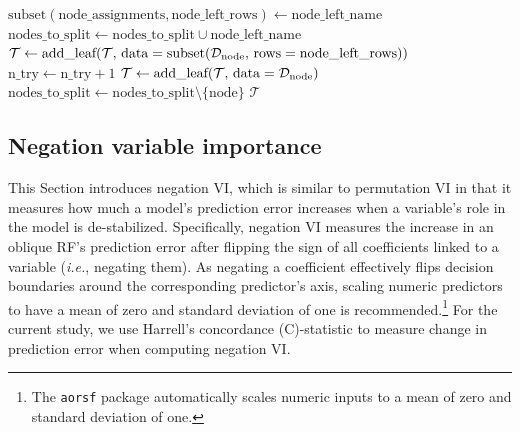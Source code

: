 \documentclass[12pt]{article}\usepackage[]{graphicx}\usepackage[]{xcolor}
\newcommand{\dataset}{{\cal D}}
\newcommand{\ie}{\textit{i.e.}}
\begin{document}
\begin{algorithm}
\begin{algorithmic}[1]
         \State $\text{subset}(\text{node\_assignments}, \text{node\_left\_rows}) \gets \text{node\_left\_name}$
           \State $\text{nodes\_to\_split} \gets \text{nodes\_to\_split} \cup \text{node\_left\_name}$
         \Else
           \State $\mathcal{T} \gets \text{add\_leaf}(\mathcal{T},\, \text{data} = \text{subset}(\dataset_{\text{node}},\,\text{rows} = \text{node\_left\_rows}))$
         \EndIf
         \State $\text{n\_try} \gets \text{n\_try} + 1$
         \State {}
       \Else
         \State $\mathcal{T} \gets \text{add\_leaf}(\mathcal{T},\, \text{data} =\dataset_{\text{node}})$
       \EndIf
       \State $\text{nodes\_to\_split} \gets \text{nodes\_to\_split} \setminus \{\text{node}\}$
     \EndFor
  \EndWhile
  \State \Return $\mathcal{T}$
  \end{algorithmic}
\end{algorithm}

\subsection{Negation variable importance} \label{sec:negation_vi}

This Section introduces negation VI, which is similar to permutation VI in that it measures how much a model’s prediction error increases when a variable’s role in the model is de-stabilized. Specifically, negation VI measures the increase in an oblique RF's prediction error after flipping the sign of all coefficients linked to a variable (\ie, negating them). As negating a coefficient effectively flips decision boundaries around the corresponding predictor's axis, scaling numeric predictors to have a mean of zero and standard deviation of one is recommended.\footnote{The \texttt{aorsf} package automatically scales numeric inputs to a mean of zero and standard deviation of one.} For the current study, we use Harrell's concordance (C)-statistic \citep{harrell1982evaluating} to measure change in prediction error when computing negation VI.

\end{document}

